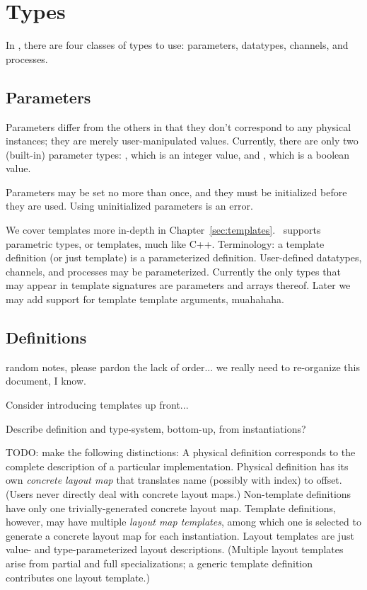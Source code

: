 

\chapter{Types}
\label{sec:types}

In \artxx, there are four classes of types to use:
parameters, datatypes, channels, and processes.  

\section{Parameters}
\label{sec:parameters}

Parameters differ from the others in that they don't correspond
to any physical instances; they are merely user-manipulated values.  
Currently, there are only two (built-in) parameter types: 
\pint, which is an integer value,
and \pbool, which is a boolean value.  

Parameters may be set no more than once, and they must be 
initialized before they are used.  
Using uninitialized parameters is an error.  


We cover templates more in-depth in Chapter~\ref{sec:templates}.  
\artxx\ supports parametric types, or templates, much like C++. 
Terminology: a template definition (or just template)
is a parameterized definition.  
User-defined datatypes, channels, and processes may be parameterized.  
Currently the only types that may appear in template signatures
are parameters and arrays thereof.  
Later we may add support for template template arguments, muahahaha.  

\section{Definitions}
\label{sec:types:definition}

random notes, please pardon the lack of order...
we really need to re-organize this document, I know.

Consider introducing templates up front...

Describe definition and type-system, bottom-up, from instantiations?

TODO: make the following distinctions:
A physical definition corresponds to the complete description of
a particular implementation.  
Physical definition has its own 
\emph{concrete layout map} 
that translates name (possibly with index) to offset.  
(Users never directly deal with concrete layout maps.)  
Non-template definitions have only one trivially-generated 
concrete layout map.  
Template definitions, however, may have multiple \emph{layout map templates}, 
among which one is selected to generate a concrete layout map for
each instantiation.  
Layout templates are just value- and type-parameterized layout descriptions.  
(Multiple layout templates arise from partial and full specializations; 
a generic template definition contributes one layout template.)


